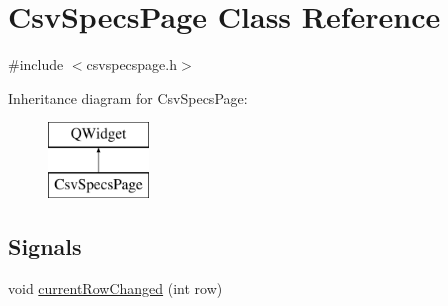 \hypertarget{class_csv_specs_page}{}\section{Csv\+Specs\+Page Class Reference}
\label{class_csv_specs_page}


{\ttfamily \#include $<$csvspecspage.\+h$>$}

Inheritance diagram for Csv\+Specs\+Page\+:\begin{figure}[H]
\begin{center}
\leavevmode
\includegraphics[height=2.000000cm]{dd/d42/class_csv_specs_page}
\end{center}
\end{figure}
\subsection*{Signals}
\begin{DoxyCompactItemize}
\item 
void \mbox{\hyperlink{class_csv_specs_page_acf9d78c7c5d97db720434396f2a5a985}{current\+Row\+Changed}} (int row)
\end{DoxyCompactItemize}
